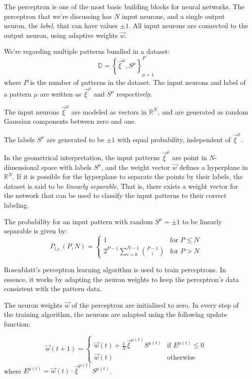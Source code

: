 The perceptron is one of the most basic building blocks for neural networks.
The perceptron that we're discussing has \(N\) input neurons, and a single output neuron, the \emph{label}, that can have values \(\pm1\).
All input neurons are connected to the output neuron, using adaptive weights \(\vec{w}\).

We're regarding multiple patterns bundled in a dataset:
\[ \mathbb{D} = \left\{ \vec{\xi}^\mu, S^\mu \right\} _{\mu=1}^{P} \]
where \(P\) is the number of patterns in the dataset.
The input neurons and label of a pattern \(\mu\) are written as \(\vec{\xi}^\mu\) and \(S^\mu\) respectively.

The input neurons \(\vec{\xi}^\mu\) are modeled as vectors in \(\mathbb{R}^N\), and are generated as random Gaussian components between zero and one.

The labels \(S^\mu\) are generated to be \(\pm1\) with equal probability, independent of \(\vec{\xi}^\mu\).

In the geometrical interpretation, the input patterns \(\vec{\xi}^\mu\) are point in \(N\)-dimensional space with labels \(S^\mu\), and the weight vector \(\vec{w}\) defines a hyperplane in \(\mathbb{R}^N\).
If it is possible for the hyperplane to separate the points by their labels, the dataset is said to be \emph{linearly separable}.
That is, there exists a weight vector for the network that can be used to classify the input patterns to their correct labeling.

The probability for an input pattern with random \(S^\mu = \pm1\) to be linearly separable is given by\cite{perceptron_slides2}:
\[
P_{l.s.}(P, N) = 
\begin{cases}
    1                                       & \text{for } P\leq N \\
    2^{P-1}\sum_{i=0}^{N-1}\binom{P - 1}{i} & \text{for } P > N
\end{cases}
\]

Rosenblatt's perceptron learning algorithm\cite{rosenblatt1958perceptron} is used to train perceptrons.
In essence, it works by adapting the neuron weights to keep the perceptron's data consistent with the pattern data.

The neuron weights \(\vec{w}\) of the perceptron are initialized to zero.
In every step of the training algorithm, the neurons are adapted using the following update function:

\[
\vec{w}(t + 1) = 
\begin{cases}
    \vec{w}(t) + \frac{1}{N}\vec{\xi}^{\mu(t)}S^{\mu(t)}    & \text{if } E^{\mu(t)} \leq 0 \\
    \vec{w}(t)                                              & \text{otherwise}
\end{cases}
\]
where \(E^{\mu(t)} = \vec{w}(t)\cdot\vec{\xi}^{\mu(t)}S^{\mu(t)}\).

